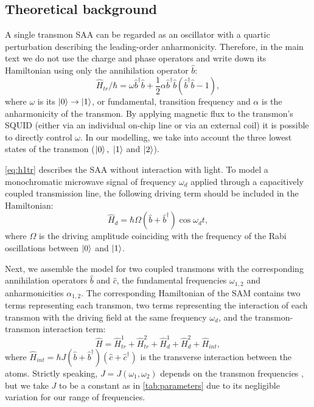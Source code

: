 \documentclass[%
 aps, prx,
 amsmath,amssymb,
 reprint,%
superscriptaddress
]{revtex4-2}
\begin{document}
\subsection{Theoretical background}

A single transmon SAA can be regarded as an 
oscillator with a quartic perturbation describing 
the leading-order anharmonicity. Therefore, in 
the main text we do not use the charge and phase 
operators and write down its Hamiltonian using 
only the annihilation operator $\hat b$:
\begin{equation}
\hat{{H}}_{tr}/\hbar = \omega \hat 
b^{\dagger}\hat b +\frac{1}{2}\alpha \hat 
b^{\dagger}\hat b(\hat b^{\dagger}\hat b-1),
\label{eq:h1tr}
\end{equation}
where $\omega$ is its 
$\ket{0}\rightarrow\ket{1}$, or fundamental, 
transition frequency and $\alpha$ is the 
anharmonicity of the transmon. By applying 
magnetic flux to the transmon's SQUID (either via 
an individual on-chip line or via an external 
coil) it is possible \cite{koch2007charge} to 
directly  control $\omega$. In our modelling, we 
take into account the three lowest states of the 
transmon ($\ket{0},\ \ket{1}$ and $\ket{2}$).

\autoref{eq:h1tr} describes the SAA without 
interaction with light. To model a monochromatic 
microwave signal of frequency $\omega_d$ applied 
through a capacitively coupled transmission line, 
the following driving term should be included in 
the Hamiltonian:
\begin{equation}
\hat H_{d} = \hbar \Omega (\hat b+\hat b^{\dagger}) \cos\omega_d t,
\end{equation}
where $\Omega$ is the driving amplitude coinciding with the frequency of the Rabi oscillations between $\ket{0}$ and $\ket{1}$.

Next, we assemble the model for two coupled 
transmons with the corresponding annihilation 
operators $\hat b$ and $\hat c$, the fundamental 
frequencies $\omega_{1,2}$ and anharmonicities 
$\alpha_{1,2}$. The corresponding Hamiltonian of 
the SAM contains two terms representing each 
transmon, two terms representing the interaction 
of each transmon with the driving field at the 
same frequency $\omega_d$, and the 
transmon-transmon interaction term:
\begin{equation}\label{Hsystem}
\hat H = \hat H_{tr}^{1}+\hat H_{tr}^{2}+\hat H_{d}^1+\hat H_{d}^2+\hat H_{int},
\end{equation}
where $\hat H_{int} = \hbar J (\hat b +\hat 
b^\dag)(\hat c+\hat c^{\dagger})$ is the 
transverse interaction between the atoms. 
Strictly speaking, $J = J(\omega_1, \omega_2)$ 
depends on the transmon 
frequencies \cite{koch2007charge}, but we take $J$ 
to be a constant as in \autoref{tab:parameters} 
due to its negligible variation for our range of 
frequencies.  
\end{document}
